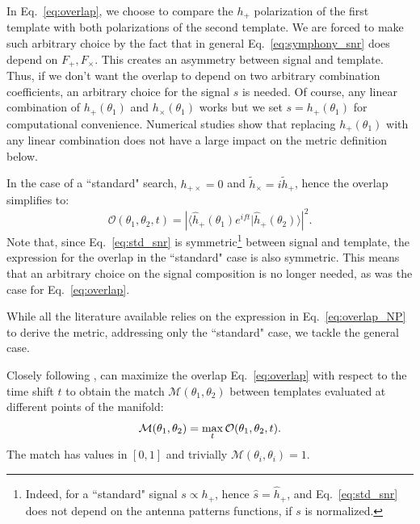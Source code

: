 \documentclass[twocolumn,showpacs,preprintnumbers,nofootinbib,prd,
superscriptaddress,10pt]{revtex4-2}
\newcommand{\scalar}[2]{\langle #1|#2 \rangle}
\begin{document}
In Eq.~\eqref{eq:overlap}, we choose to compare the $h_+$ polarization of the first template with both polarizations of the second template. We are forced to make such arbitrary choice by the fact that in general Eq.~\eqref{eq:symphony_snr} does depend on $F_+, F_\times$.
This creates an asymmetry between signal and template.
Thus, if we don't want the overlap to depend on two arbitrary combination coefficients, an arbitrary choice for the signal $s$ is needed.
Of course, any linear combination of $h_+(\theta_1)$ and $h_\times(\theta_1)$ works but we set $s = h_+(\theta_1)$ for computational convenience. Numerical studies show that replacing $h_+(\theta_1)$ with any linear combination does not have a large impact on the metric definition below.

In the case of a ``standard" search, $h_{+\times} = 0$ and $\tilde{h}_\times = i \tilde{h}_+$, hence the overlap simplifies to:
\begin{equation}\label{eq:overlap_NP}
\mathcal{O}(\theta_1,\theta_2, t) = \left|\scalar{\hat{h}_+(\theta_1)e^{i ft}}{\hat{h}_+(\theta_2)} \right|^2.
\end{equation}
Note that, since Eq.~\eqref{eq:std_snr} is symmetric\footnote{Indeed, for a ``standard" signal $s \propto h_+$, hence $\hat{s} = \hat{h}_+$, and Eq.~\eqref{eq:std_snr} does not depend on the antenna patterns functions, if $s$ is normalized.} between signal and template, the expression for the overlap in the ``standard" case is also symmetric. This means that an arbitrary choice on the signal composition is no longer needed, as was the case for Eq.~\eqref{eq:overlap}.

While all the literature available \cite{owen_metric, Messenger:2008ta, Prix:2007ks, Brown:2012qf, Roy:2017oul, Coogan:2022qxs, Hanna:2022zpk} relies on the expression in Eq.~\eqref{eq:overlap_NP} to derive the metric, addressing only the ``standard" case, we tackle the general case.

Closely following \cite{owen_metric}, can maximize the overlap Eq.~\eqref{eq:overlap} with respect to the time shift $t$ to obtain the match $\mathcal{M}(\theta_1,\theta_2)$ between templates evaluated at different points of the manifold:
\begin{equation}\label{eq:match}
	\mathcal{M}(\theta_1,\theta_2) = \max_t \mathcal{O}(\theta_1,\theta_2, t). \\
\end{equation}
%
The match has values in $[0,1]$ and trivially $\mathcal{M}(\theta_i,\theta_i) = 1$.
\end{document}
